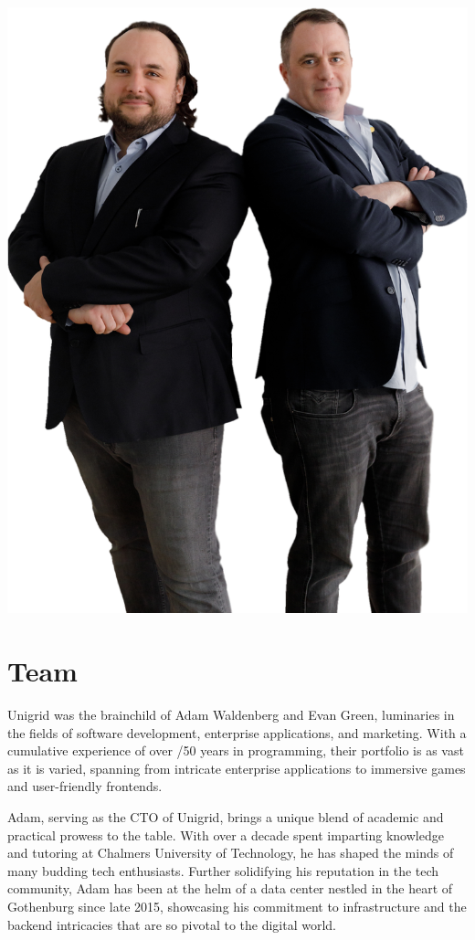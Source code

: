 \documentclass[a4paper,oneside]{article}
\begin{document}
\begin{center}
	\includegraphics{adam-evan}
\end{center}

\section{Team}
Unigrid was the brainchild of Adam Waldenberg and Evan Green, luminaries in the fields of software development, enterprise applications, and marketing. With a cumulative experience of over /50 years in programming, their portfolio is as vast as it is varied, spanning from intricate enterprise applications to immersive games and user-friendly frontends.

Adam, serving as the CTO of Unigrid, brings a unique blend of academic and practical prowess to the table. With over a decade spent imparting knowledge and tutoring at Chalmers University of Technology, he has shaped the minds of many budding tech enthusiasts. Further solidifying his reputation in the tech community, Adam has been at the helm of a data center nestled in the heart of Gothenburg since late 2015, showcasing his commitment to infrastructure and the backend intricacies that are so pivotal to the digital world.
\end{document}
